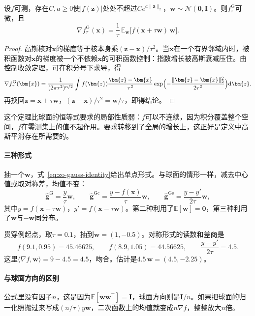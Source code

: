 \begin{theorem}[高斯平滑的梯度恒等式]
\label{thm:zo-gauss-identity}
设$f$可测，存在$C,a\geq0$使$\lvert f(\bm{z})\rvert$处处不超过$Ce^{a\lVert\bm{z}\rVert_2}$，$\bm{w}\sim\mathcal{N}(\bm{0},\bm{I})$。则$f^{\mathrm{G}}_{\tau}$可微，且
\begin{equation}
 \nabla f^{\mathrm{G}}_{\tau}(\bm{x})=\frac{1}{\tau}\,\mathbb{E}_{\bm{w}}\bigl[f(\bm{x}+\tau\bm{w})\,\bm{w}\bigr].
 \label{eq:zo-gauss-identity}
\end{equation}
\end{theorem}

\begin{proof}
高斯核对$\bm{x}$的梯度等于核本身乘$(\bm{z}-\bm{x})/\tau^2$。当$\bm{x}$在一个有界邻域内时，被积函数对$\bm{x}$的梯度被一个不依赖$\bm{x}$的可积函数控制：指数增长被高斯衰减压住。由控制收敛定理，可在积分号下求导，得
\[
 \nabla f^{\mathrm{G}}_{\tau}(\bm{x})=\frac{1}{(2\pi\tau^2)^{n/2}}\int f(\bm{z})\frac{\bm{z}-\bm{x}}{\tau^2}\exp\Bigl(-\frac{\lVert\bm{z}-\bm{x}\rVert_2^2}{2\tau^2}\Bigr)\mathrm{d}\bm{z}.
\]
再换回$\bm{z}=\bm{x}+\tau\bm{w}$，$(\bm{z}-\bm{x})/\tau^2=\bm{w}/\tau$，即得结论。
\end{proof}

这个定理比球面的恒等式要求的局部性质弱：$f$可以不连续，因为积分覆盖整个空间，$f$在零测集上的值不起作用。要求转移到了全局的增长上，这正好是定义中高斯平滑存在所需要的。

\paragraph{三种形式}
抽一个$\bm{w}$，式~\eqref{eq:zo-gauss-identity}给出单点形式。与球面的情形一样，减去中心值或取对称差，均值不变：
\begin{equation}
 \hat{\bm{g}}^{\mathrm{G}}=\frac{y}{\tau}\bm{w},\qquad
 \hat{\bm{g}}^{\mathrm{Gc}}=\frac{y-f(\bm{x})}{\tau}\bm{w},\qquad
 \hat{\bm{g}}^{\mathrm{Gs}}=\frac{y-y'}{2\tau}\bm{w},
 \label{eq:zo-gauss-estimators}
\end{equation}
其中$y=f(\bm{x}+\tau\bm{w})$，$y'=f(\bm{x}-\tau\bm{w})$。第二种利用了$\mathbb{E}[\bm{w}]=\bm{0}$，第三种利用了$\bm{w}$与$-\bm{w}$同分布。

贯穿例起点，取$\tau=0.1$，抽到$\bm{w}=(1,-0.5)$。对称形式的读数和差商是
\[
 f(9.1,0.95)=45.46625,\qquad f(8.9,1.05)=44.56625,\qquad\frac{y-y'}{2\tau}=4.5.
\]
这里$\langle\nabla f,\bm{w}\rangle=9-4.5=4.5$，吻合。估计是$4.5\,\bm{w}=(4.5,-2.25)$。

\paragraph{与球面方向的区别}
公式里没有因子$n$，这是因为$\mathbb{E}[\bm{w}\bm{w}^\top]=\bm{I}$，球面方向则是$\bm{I}/n$。如果把球面的归一化照搬过来写成$(n/\tau)y\bm{w}$，二次函数上的均值就变成$n\nabla f$，整整放大$n$倍。

